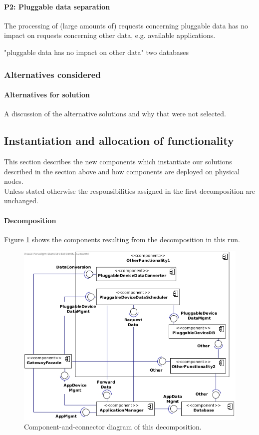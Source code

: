     \paragraph{P2: Pluggable data separation}
        The processing of (large amounts of) requests concerning pluggable data has no impact on
        requests concerning other data, e.g. available applications.

        "pluggable data has no impact on other data"
        two databases

    \subsubsection{Alternatives considered}
        \paragraph{Alternatives for solution}
            A discussion of the alternative solutions and why that were not selected.


\subsection{Instantiation and allocation of functionality}
    This section describes the new components which instantiate our solutions described
    in the section above and how components are deployed on physical nodes. \\
    Unless stated otherwise the responsibilities assigned in the first decomposition are unchanged.

    \paragraph{Decomposition}
        Figure \ref{fig:it2-cc_main} shows the components resulting from the
        decomposition in this run.

        \begin{figure}[!h]
        	\centering
            \includegraphics[width=1\textwidth]{component-diagram-2}
        	\caption{Component-and-connector diagram of this decomposition.}
            \label{fig:it2-cc_main}
        \end{figure}

